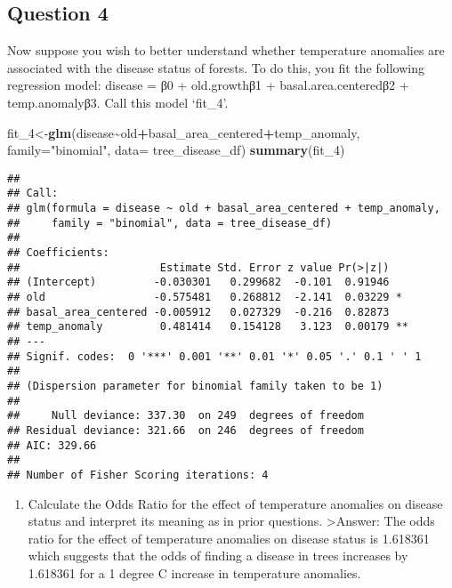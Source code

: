 \documentclass[
]{article}
\newenvironment{Shaded}{\begin{snugshade}}{\end{snugshade}}
\newcommand{\AttributeTok}[1]{\textcolor[rgb]{0.13,0.29,0.53}{#1}}
\newcommand{\FunctionTok}[1]{\textcolor[rgb]{0.13,0.29,0.53}{\textbf{#1}}}
\newcommand{\NormalTok}[1]{#1}
\newcommand{\OtherTok}[1]{\textcolor[rgb]{0.56,0.35,0.01}{#1}}
\newcommand{\SpecialCharTok}[1]{\textcolor[rgb]{0.81,0.36,0.00}{\textbf{#1}}}
\newcommand{\StringTok}[1]{\textcolor[rgb]{0.31,0.60,0.02}{#1}}
\providecommand{\tightlist}{%
  \setlength{\itemsep}{0pt}\setlength{\parskip}{0pt}}
\begin{document}
\hypertarget{question-4}{%
\subsection{Question 4}\label{question-4}}

Now suppose you wish to better understand whether temperature anomalies
are associated with the disease status of forests. To do this, you fit
the following regression model: disease = β0 + old.growthβ1 +
basal.area.centeredβ2 + temp.anomalyβ3. Call this model `fit\_4'.

\begin{Shaded}
\begin{Highlighting}[]
\NormalTok{fit\_4}\OtherTok{\textless{}{-}}\FunctionTok{glm}\NormalTok{(disease}\SpecialCharTok{\textasciitilde{}}\NormalTok{old}\SpecialCharTok{+}\NormalTok{basal\_area\_centered}\SpecialCharTok{+}\NormalTok{temp\_anomaly, }\AttributeTok{family=}\StringTok{"binomial"}\NormalTok{, }\AttributeTok{data=}\NormalTok{ tree\_disease\_df)}
\FunctionTok{summary}\NormalTok{(fit\_4)}
\end{Highlighting}
\end{Shaded}

\begin{verbatim}
## 
## Call:
## glm(formula = disease ~ old + basal_area_centered + temp_anomaly, 
##     family = "binomial", data = tree_disease_df)
## 
## Coefficients:
##                      Estimate Std. Error z value Pr(>|z|)   
## (Intercept)         -0.030301   0.299682  -0.101  0.91946   
## old                 -0.575481   0.268812  -2.141  0.03229 * 
## basal_area_centered -0.005912   0.027329  -0.216  0.82873   
## temp_anomaly         0.481414   0.154128   3.123  0.00179 **
## ---
## Signif. codes:  0 '***' 0.001 '**' 0.01 '*' 0.05 '.' 0.1 ' ' 1
## 
## (Dispersion parameter for binomial family taken to be 1)
## 
##     Null deviance: 337.30  on 249  degrees of freedom
## Residual deviance: 321.66  on 246  degrees of freedom
## AIC: 329.66
## 
## Number of Fisher Scoring iterations: 4
\end{verbatim}

\begin{enumerate}
\def\labelenumi{\alph{enumi}.}
\tightlist
\item
  Calculate the Odds Ratio for the effect of temperature anomalies on
  disease status and interpret its meaning as in prior questions.
  \textgreater Answer: The odds ratio for the effect of temperature
  anomalies on disease status is 1.618361 which suggests that the odds
  of finding a disease in trees increases by 1.618361 for a 1 degree C
  increase in temperature anomalies.
\end{enumerate}
\end{document}
